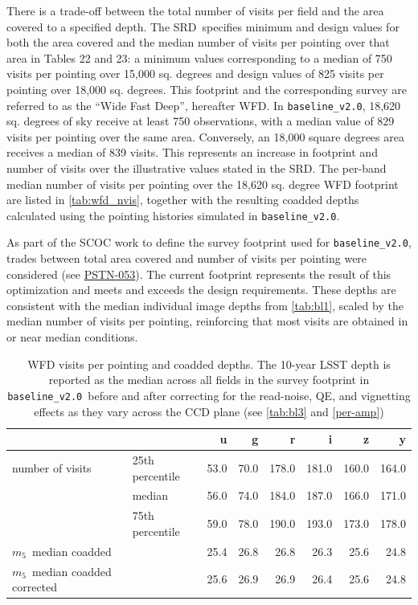 \documentclass[PST,authoryear,toc]{lsstdoc}
\newcommand{\mf}{\ensuremath{m_5}}
\newcommand{\baseline}{\texttt{baseline\_v2.0}}
\begin{document}
There is a trade-off between the total number of visits per field and the area covered to a specified depth. 
The SRD\ specifies minimum and design values for both the area covered and the median number of visits per pointing over that area in Tables 22 and 23: a minimum values corresponding to a median of 750 visits per pointing over 15,000 sq. degrees and design values of 825 visits per pointing over 18,000 sq. degrees. This footprint and the corresponding survey are referred to as the ``Wide Fast Deep'', hereafter WFD. In  \baseline, 18,620 sq. degrees of sky receive at least 750 observations, with a median value of 829 visits per pointing over the same area.  Conversely, an 18,000 square degrees area receives a median of 839 visits.
This represents an increase in footprint and number of visits over the illustrative values stated in the SRD. The per-band median number of visits per pointing over the 18,620 sq. degree WFD footprint are listed in \autoref{tab:wfd_nvis}, together with the resulting coadded depths calculated using the pointing histories simulated in \baseline. 

 
  As part of the SCOC work to define the survey footprint used for \baseline, trades between total area covered and number of visits per pointing were considered (see \href{https://pstn-053.lsst.io}{{PSTN-053}}). The current footprint represents the result of this optimization and meets and exceeds the design requirements.
  These depths are consistent with the median individual image depths from \autoref{tab:bl1}, scaled by the median number of visits per pointing, reinforcing that most visits are obtained in or near median conditions. 
 
\FloatBarrier

\begin{table}[h!]
\caption{WFD visits per pointing and coadded  depths. The 10-year LSST depth is reported as the median across all fields in the survey footprint in \baseline\ before and after correcting for the read-noise, QE, and vignetting effects as they vary across the CCD plane (see \autoref{tab:bl3} and  \autoref{per-amp})}\label{tab:wfd_nvis}
\small
    \centering
\begin{tabular}{llrrrrrr}
\hline
{} & &    u &     g &      r &      i &      z &      y \\
\hline
number of visits &25th percentile &  53.0 &  70.0 &  178.0 &  181.0 &  160.0 &  164.0 \\
&   median       &  56.0 &  74.0 &  184.0 &  187.0 &  166.0 &  171.0 \\
& 75th percentile &  59.0 &  78.0 &  190.0 &  193.0 &  173.0 &  178.0 \\
\hline
\mf\ median coadded &         &  25.4 &  26.8 &   26.8 &   26.3 &   25.6 &   24.8 \\
\hline
\mf\ median coadded corrected&         &  25.6 &  26.9 &   26.9 &   26.4 &   25.6 &   24.8 \\
\end{tabular}
\end{table}
\end{document}
